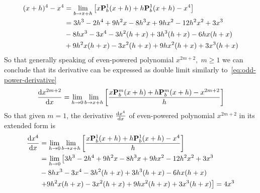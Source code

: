 \begin{equation*}
    \begin{split}
    (x+h)
        ^{4} - x^{4}
        &= \lim_{b \to x+h} \left[ x{\mathbf{P}}\sp{1} \sb{b}(x+h) + h{\mathbf{P}}\sp{1} \sb{b}(x+h)  - x^{4} \right] \\
        &= 3 h^3 - 2 h^4 + 9 h^2 x - 8 h^3 x + 9 h x^2 - 12 h^2 x^2 + 3 x^3 \\
        &- 8 h x^3 - 3 x^4 - 3 h^2 (h + x) + 3 h^3 (h + x) - 6 h x (h + x) \\
        &+ 9 h^2 x (h + x) - 3 x^2 (h + x) + 9 h x^2 (h + x) + 3 x^3 (h + x)
    \end{split}
\end{equation*}
So that generally speaking of even-powered polynomial $x^{2m+2}, \; m\geq 1$ we can conclude that its derivative
can be expressed as double limit similarly to~\eqref{eq:odd-power-derivative}
\begin{equation}
    \odv{x^{2m+2}}{x} =\lim_{h \to 0} \lim_{b \to x+h} \left[ \frac{x\polynomialP{m}{b}{x+h} + h\polynomialP{m}{b}{x+h}  - x^{2m+2}}{h} \right]
    \label{eq:even-power-derivative}
\end{equation}
So that given $m=1$, the derivative $\odv{x^4}{x}$ of even-powered polynomial $x^{2m+2}$ in its extended form is
\begin{equation*}
    \begin{split}
        \odv{x^4}{x}
        &= \lim_{h\to 0} \lim_{b \to x+h} \left[ \frac{x\polynomialP{1}{b}{x+h} + h\polynomialP{1}{b}{x+h}  - x^{4}}{h} \right] \\
        &= \lim_{h\to 0} \left[  3 h^3 - 2 h^4 + 9 h^2 x - 8 h^3 x + 9 h x^2 - 12 h^2 x^2 + 3 x^3 \right. \\
        &- 8 h x^3 - 3 x^4 - 3 h^2 (h + x) + 3 h^3 (h + x) - 6 h x (h + x) \\
        &\left. + 9 h^2 x (h + x) - 3 x^2 (h + x) + 9 h x^2 (h + x) + 3 x^3 (h + x) \right] = 4x^3
    \end{split}
\end{equation*}
